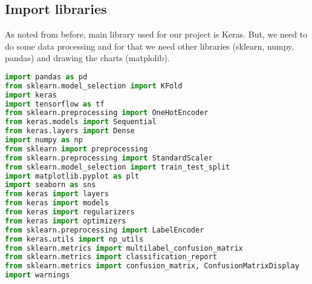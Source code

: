 \subsection{Import libraries}
As noted from before, main library used for our project is Keras. But, we need to do some data processing and for that we need other libraries (sklearn, numpy, pandas) and drawing the charts (matplolib).
\begin{lstlisting}[language=Python, caption=Import libraries]
import pandas as pd 
from sklearn.model_selection import KFold
import keras
import tensorflow as tf
from sklearn.preprocessing import OneHotEncoder
from keras.models import Sequential
from keras.layers import Dense
import numpy as np
from sklearn import preprocessing
from sklearn.preprocessing import StandardScaler
from sklearn.model_selection import train_test_split
import matplotlib.pyplot as plt
import seaborn as sns
from keras import layers
from keras import models
from keras import regularizers
from keras import optimizers
from sklearn.preprocessing import LabelEncoder 
from keras.utils import np_utils
from sklearn.metrics import multilabel_confusion_matrix
from sklearn.metrics import classification_report
from sklearn.metrics import confusion_matrix, ConfusionMatrixDisplay
import warnings
\end{lstlisting}